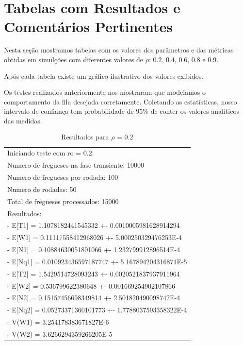 \documentclass[a4paper,12pt]{report}
\begin{document}
\chapter{Tabelas com Resultados e Comentários Pertinentes}
Nesta seção mostramos tabelas com os valores dos parâmetros e das métricas obtidas em simulções com diferentes valores de $\rho$: 0.2, 0.4, 0.6, 0.8 e 0.9.

Após cada tabela existe um gráfico ilustrativo dos valores exibidos.

Os testes realizados anteriormente nos mostraram que modelamos o comportamento da fila desejada corretamente. Coletando as estatísticas, nosso intervalo de confiança tem probabilidade de 95\% de conter os valores analíticos das medidas.

\begin{table}[htbp]
  \begin{tabular}{l}
	\small Iniciando teste com ro = 0.2. \\
	\small Numero de fregueses na fase transiente: 10000 \\
	\small Numero de fregueses por rodada: 100 \\
	\small Numero de rodadas: 50 \\
	\small Total de fregueses processados: 15000 \\
	\small Resultados: \\
	\small - E[T1] = 1.1078182441545332 +- 0.0010005981628914294 \\
	\small - E[W1] = 0.11117558412968026 +- 5.000250329476253E-4 \\
	\small - E[N1] = 0.10884630051801066 +- 1.232799912896514E-4 \\
	\small - E[Nq1] = 0.010923436597187747 +- 5.167894204316871E-5 \\
	\small - E[T2] = 1.5429514728093243 +- 0.0020521837937911964 \\
	\small - E[W2] = 0.536799622380648 +- 0.001669254902107866 \\
	\small - E[N2] = 0.15157456698349814 +- 2.501820490098742E-4 \\
	\small - E[Nq2] = 0.05273371360101773 +- 1.7788037593358322E-4 \\
	\small - V(W1) = 3.254178383671827E-6 \\
	\small - V(W2) = 3.6266294359266205E-5 \\
  \end{tabular}
\caption{Resultados para $\rho$ = 0.2}
\end{table}
\end{document}
